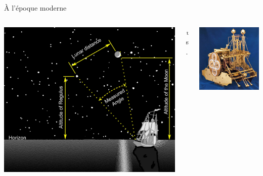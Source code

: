 \begin{frame}{À l'époque moderne}
\begin{columns}
	\begin{column}{0.40\linewidth}
		\centering
		\includegraphics[height=0.35\paperheight]{../resources/illustrations/lunar-distance} \\
	\end{column}
	\begin{column}{0.09\linewidth} \centering \huge \emph vs. \end{column}
	\begin{column}{0.40\linewidth}
		\centering
		\includegraphics[height=0.35\paperheight]{../resources/illustrations/harrison} \\

\end{column}
\end{columns}
\end{frame}

